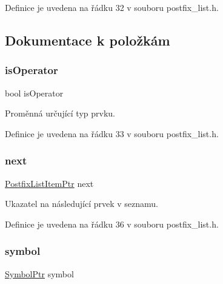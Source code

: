 Definice je uvedena na řádku 32 v souboru postfix\+\_\+list.\+h.



\subsection{Dokumentace k položkám}
\mbox{\label{struct_s___postfix_list_item_a4dc881eaac3e93ea4d9e27f5e551401e}} 
\subsubsection{\texorpdfstring{is\+Operator}{isOperator}}
{\footnotesize\ttfamily bool is\+Operator}



Proměnná určující typ prvku. 



Definice je uvedena na řádku 33 v souboru postfix\+\_\+list.\+h.

\mbox{\label{struct_s___postfix_list_item_ac57b059aa3e185ab3e15838c28e0c5f7}} 
\subsubsection{\texorpdfstring{next}{next}}
{\footnotesize\ttfamily \hyperlink{postfix__list_8h_a8feb56873a59e2796c49dce10bc3d21c}{Postfix\+List\+Item\+Ptr} next}



Ukazatel na následující prvek v seznamu. 



Definice je uvedena na řádku 36 v souboru postfix\+\_\+list.\+h.

\mbox{\label{struct_s___postfix_list_item_a6c83d4e8bedc21d04db7485eda709630}} 
\subsubsection{\texorpdfstring{symbol}{symbol}}
{\footnotesize\ttfamily \hyperlink{symtable_8h_ae75ae77f6060003cdcf7bd31d2c972f2}{Symbol\+Ptr} symbol}



